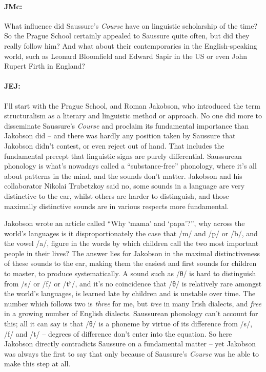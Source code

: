 \documentclass[output=paper]{langscibook}
\begin{document}
\paragraph*{JMc:}  What influence did Saussure’s \textit{Course} have on linguistic scholarship of the time? So the Prague School certainly appealed to Saussure quite often, but did they really follow him? And what about their contemporaries in the English-speaking world, such as Leonard Bloomfield and Edward Sapir in the US or even John Rupert Firth in England?


\paragraph*{JEJ:}  I’ll start with the Prague School, and Roman Jakobson, who introduced the term structuralism as a literary and linguistic method or approach. No one did more to disseminate Saussure’s \textit{Course} and proclaim its fundamental importance than Jakobson did – and there was hardly any position taken by Saussure that Jakobson didn’t contest, or even reject out of hand. That includes the fundamental precept that linguistic signs are purely differential. Saussurean phonology is what’s nowadays called a “substance-free” phonology, where it’s all about patterns in the mind, and the sounds don’t matter. Jakobson and his collaborator Nikolai Trubetzkoy said no, some sounds in a language are very distinctive to the ear, whilst others are harder to distinguish, and those maximally distinctive sounds are in various respects more fundamental.

\begin{sloppypar}Jakobson wrote an article called “Why `mama' and `papa'?”, why across the world’s languages is it disproportionately the case that /m/ and /p/ or /b/, and the vowel /a/, figure in the words by which children call the two most important people in their lives? The answer lies for Jakobson in the maximal distinctiveness of these sounds to the ear, making them the easiest and first sounds for children to master, to produce systematically. A sound such as /θ/ is hard to distinguish from /s/ or /f/ or /tʰ/, and it’s no coincidence that /θ/ is relatively rare amongst the world’s languages, is learned late by children and is unstable over time. The number which follows two is \textit{three} for me, but \textit{tree} in many Irish dialects, and \textit{free} in a growing number of English dialects. Saussurean phonology can’t account for this; all it can say is that /θ/ is a phoneme by virtue of its difference from /s/, /f/ and /t/ – degrees of difference don’t enter into the equation. So here Jakobson directly contradicts Saussure on a fundamental matter – yet Jakobson was always the first to say that only because of Saussure’s \textit{Course} was he able to make this step at all.\end{sloppypar}
\end{document}
